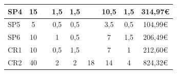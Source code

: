 \documentclass[a4paper]{article}
\begin{document}
\begin{table}[H]
\begin{center}
\begin{tabular}{|l|c|c|c|c|c|c|c|c|}
            {\color[HTML]{000000} SP4}                                                             & {\color[HTML]{000000} 15}                                                               & {\color[HTML]{000000} }                   & {\color[HTML]{000000} 1,5}                & {\color[HTML]{000000} 1,5}             & {\color[HTML]{000000} }                 & {\color[HTML]{000000} 10,5}                 & {\color[HTML]{000000} 1,5}                & {\color[HTML]{000000} 314,97€}             \\ \hline
            {\color[HTML]{000000} SP5}                                                             & {\color[HTML]{000000} 5}                                                                & {\color[HTML]{000000} }                   & {\color[HTML]{000000} 0,5}              & {\color[HTML]{000000} 0,5}           & {\color[HTML]{000000} }                 & {\color[HTML]{000000} 3,5}                & {\color[HTML]{000000} 0,5}              & {\color[HTML]{000000} 104,99€}             \\ \hline
            {\color[HTML]{000000} SP6}                                                             & {\color[HTML]{000000} 10}                                                               & {\color[HTML]{000000} }                   & {\color[HTML]{000000} 1}                & {\color[HTML]{000000} 0,5}             & {\color[HTML]{000000} }                 & {\color[HTML]{000000} 7}                 & {\color[HTML]{000000} 1,5}                & {\color[HTML]{000000} 206,49€}             \\ \hline
            {\color[HTML]{000000} CR1}                                                             & {\color[HTML]{000000} 10}                                                               & {\color[HTML]{000000} }                   & {\color[HTML]{000000} 0,5}                & {\color[HTML]{000000} 1,5}             & {\color[HTML]{000000} }                 & {\color[HTML]{000000} 7}                 & {\color[HTML]{000000} 1}                & {\color[HTML]{000000} 212,60€}             \\ \hline
            {\color[HTML]{000000} CR2}                                                             & {\color[HTML]{000000} 40}                                                               & {\color[HTML]{000000} }                   & {\color[HTML]{000000} 2}                & {\color[HTML]{000000} 2}             & {\color[HTML]{000000} 18}               & {\color[HTML]{000000} 14}                 & {\color[HTML]{000000} 4}                & {\color[HTML]{000000} 824,32€}             \\ \hline

\end{tabular}
\end{center}
\end{table}
\end{document}
